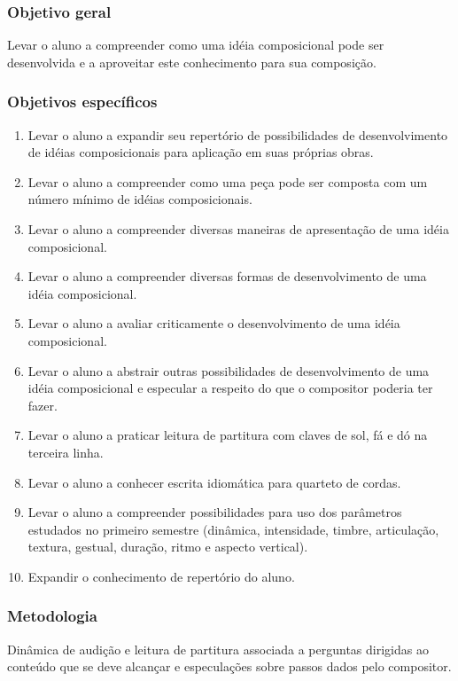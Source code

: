 \documentclass[12pt]{article}
\begin{document}
\subsubsection{Objetivo geral}

Levar o aluno a compreender como uma idéia composicional pode ser
desenvolvida e a aproveitar este conhecimento para sua composição.

\subsubsection{Objetivos específicos}

\begin{enumerate}
\item Levar o aluno a expandir seu repertório de possibilidades de
  desenvolvimento de idéias composicionais para aplicação em suas
  próprias obras.
\item Levar o aluno a compreender como uma peça pode ser composta com
  um número mínimo de idéias composicionais.
\item Levar o aluno a compreender diversas maneiras de apresentação de
  uma idéia composicional.
\item Levar o aluno a compreender diversas formas de desenvolvimento
  de uma idéia composicional.
\item Levar o aluno a avaliar criticamente o desenvolvimento de uma
  idéia composicional.
\item Levar o aluno a abstrair outras possibilidades de
  desenvolvimento de uma idéia composicional e especular a respeito do
  que o compositor poderia ter fazer.
\item Levar o aluno a praticar leitura de partitura com claves de sol,
  fá e dó na terceira linha.
\item Levar o aluno a conhecer escrita idiomática para quarteto de
  cordas.
\item Levar o aluno a compreender possibilidades para uso dos
  parâmetros estudados no primeiro semestre (dinâmica, intensidade,
  timbre, articulação, textura, gestual, duração, ritmo e aspecto
  vertical).
\item Expandir o conhecimento de repertório do aluno.
\end{enumerate}

\subsubsection{Metodologia}
Dinâmica de audição e leitura de partitura associada a perguntas
dirigidas ao conteúdo que se deve alcançar e especulações sobre passos
dados pelo compositor.
\end{document}
